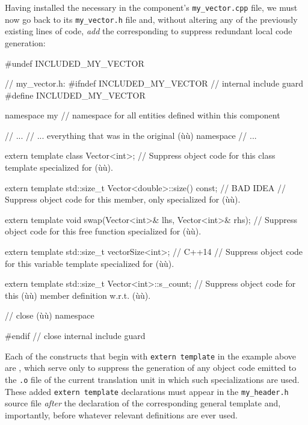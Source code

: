 Having installed the necessary  in the component's \lstinline!my_vector.cpp! file, we
must now go back to its \lstinline!my_vector.h! file and, without altering
any of the previously existing lines of code, \emph{add} the
corresponding  to
suppress redundant local code generation:

\begin{emcppshiddenlisting}[emcppsbatch=e1b]
#undef INCLUDED_MY_VECTOR
\end{emcppshiddenlisting}
\begin{emcppslisting}[emcppsbatch=e1b]
// my_vector.h:
#ifndef INCLUDED_MY_VECTOR  // internal include guard
#define INCLUDED_MY_VECTOR

namespace my  // namespace for all entities defined within this component
{

// ...
// ...  everything that was in the original (ù{}ù) namespace
// ...

extern template class Vector<int>;
    // Suppress object code for this class template specialized for (ù{}ù).

extern template std::size_t Vector<double>::size() const;  // BAD IDEA
    // Suppress object code for this member, only specialized for (ù{}ù).

extern template void swap(Vector<int>& lhs, Vector<int>& rhs);
    // Suppress object code for this free function specialized for (ù{}ù).

extern template std::size_t vectorSize<int>;  // C++14
    // Suppress object code for this variable template specialized for (ù{}ù).

extern template std::size_t Vector<int>::s_count;
    // Suppress object code for this (ù{}ù) member definition w.r.t. (ù{}ù).

}  // close (ù{}ù) namespace

#endif  // close internal include guard
\end{emcppslisting}

\noindent Each of the constructs that begin with \lstinline!extern!~\lstinline!template!
in the example above are , which serve only to suppress the generation of any
object code emitted to the \lstinline!.o! file of the current translation
unit in which such specializations are used. These added
\lstinline!extern!~\lstinline!template! declarations must appear in the
\lstinline!my_header.h! source file \emph{after} the declaration of the
corresponding general template and, importantly, before whatever
relevant definitions are ever used.

